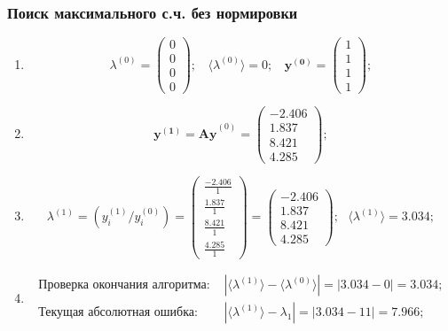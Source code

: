 \subsubsection{Поиск максимального с.ч. без нормировки}
\begin{enumerate}
\item $$
    \lambda^{(0)} =\begin{pmatrix}0\\0\\0\\0\end{pmatrix}; ~~~~ \langle\lambda^{(0)}\rangle = 0;~~~~
    \mathbf{y^{(0)}} =\begin{pmatrix}1\\1\\1\\1\end{pmatrix};$$

\item $$
    \mathbf{y^{(1)} =Ay}^{(0)} = \begin{pmatrix} -2.406\\1.837\\8.421\\4.285\end{pmatrix};$$

\item $$
     \lambda^{(1)} =\left( y^{(1)}_i / y^{(0)}_i \right) =
     \begin{pmatrix} \frac{-2.406}{1}\\\frac{1.837}{1}\\\frac{8.421}{1}\\\frac{4.285}{1}\end{pmatrix}=
     \begin{pmatrix} -2.406\\1.837\\8.421\\4.285\end{pmatrix}; ~~~
     \langle\lambda^{(1)}\rangle = 3.034;$$

\item $$
    \begin{matrix}
        \text{Проверка окончания алгоритма: }&|\langle\lambda^{(1)}\rangle - \langle\lambda^{(0)}\rangle| = |3.034 - 0| = \mathbf{3.034};\\
        \text{Текущая абсолютная ошибка: }&|\langle\lambda^{(1)}\rangle - \lambda_1| = |3.034 - 11| = \mathbf{7.966};
    \end{matrix}$$




\end{enumerate}
